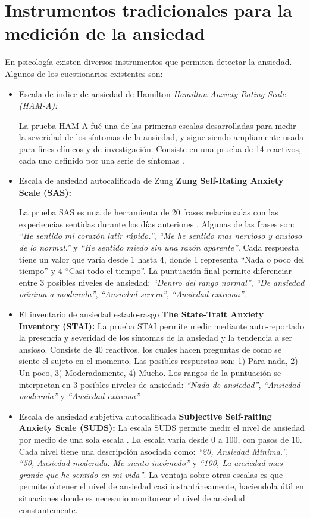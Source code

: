 \section{Instrumentos tradicionales para la medici\'on de la ansiedad}
        En psicolog\'ia existen diversos instrumentos que permiten detectar la ansiedad. Algunos de los cuestionarios existentes son:
        \begin{itemize}

		\item Escala de \'indice de ansiedad de Hamilton \textit{Hamilton Anxiety Rating Scale (HAM-A):}

			La prueba HAM-A fu\'e una de las primeras escalas desarrolladas para medir la severidad de los s\'intomas de la ansiedad, y sigue siendo ampliamente usada para fines cl\'inicos y de investigaci\'on. Consiste en una prueba de 14 reactivos, cada uno definido por una serie de s\'intomas \citep{PAPT467}.
		\item Escala de ansiedad autocalificada de Zung \textbf{Zung Self-Rating Anxiety Scale (SAS):}

			La prueba SAS es una de herramienta de 20 frases relacionadas con las experiencias sentidas durante los d\'ias anteriores \citep{Zung1971371}. Algunas de las frases son: \textit{``He sentido mi coraz\'on latir r\'apido.''}, \textit{``Me he sentido mas nervioso y ansioso de lo normal.''} y \textit{``He sentido miedo sin una raz\'on aparente''}. Cada respuesta tiene un valor que var\'ia desde 1 hasta 4, donde 1 representa ``Nada o poco del tiempo'' y 4 ``Casi todo el tiempo''. La puntuaci\'on final permite diferenciar entre 3 posibles niveles de ansiedad: \textit{``Dentro del rango normal''}, \textit{``De ansiedad m\'inima a moderada''}, \textit{``Ansiedad severa''}, \textit{``Ansiedad extrema''}.
		\item El inventario de ansiedad estado-rasgo \textbf{The State-Trait Anxiety Inventory (STAI):}
			La prueba STAI permite medir mediante auto-reportado la presencia y severidad de los s\'intomas de la ansiedad y la tendencia a ser ansioso\citep{julian2011measures}. Consiste de 40 reactivos, los cuales hacen preguntas de como se siente el sujeto en el momento. Las posibles respuestas son: 1) Para nada, 2) Un poco, 3) Moderadamente, 4) Mucho. Los rangos de la puntuaci\'on se interpretan en 3 posibles niveles de ansiedad: \textit{``Nada de ansiedad''}, \textit{``Ansiedad moderada''} y \textit{``Ansiedad extrema''}

		\item Escala de ansiedad subjetiva autocalificada \textbf{Subjective Self-raiting Anxiety Scale (SUDS):}
			La escala SUDS permite medir el nivel de ansiedad por medio de una sola escala \citep{wolpe1973practice}. La escala var\'ia desde 0 a 100, con pasos de 10. Cada nivel tiene una descripci\'on asociada como: \textit{``20, Ansiedad M\'inima.''}, \textit{``50, Ansiedad moderada. Me siento inc\'omodo''} y \textit{``100, La ansiedad mas grande que he sentido en mi vida''}. La ventaja sobre otras escalas es que permite obtener el nivel de ansiedad casi instant\'aneamente, haciendola \'util en situaciones donde es necesario monitorear el nivel de ansiedad constantemente.
        \end{itemize}


